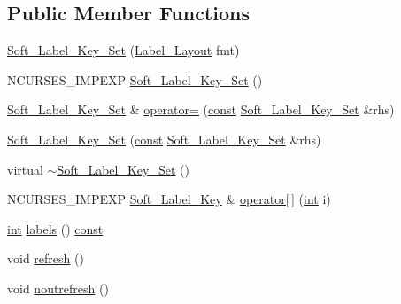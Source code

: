 \subsection*{Public Member Functions}
\begin{DoxyCompactItemize}
\item 
\hyperlink{class_soft___label___key___set_a720d08d51f3d9097fd07fd54a43b7961}{Soft\-\_\-\-Label\-\_\-\-Key\-\_\-\-Set} (\hyperlink{class_soft___label___key___set_a4d68b5593db1c9c763e3916b2b6edaf6}{Label\-\_\-\-Layout} fmt)
\item 
N\-C\-U\-R\-S\-E\-S\-\_\-\-I\-M\-P\-E\-X\-P \hyperlink{class_soft___label___key___set_aa7d2edb80b72f3f586da60cecfabc5c3}{Soft\-\_\-\-Label\-\_\-\-Key\-\_\-\-Set} ()
\item 
\hyperlink{class_soft___label___key___set}{Soft\-\_\-\-Label\-\_\-\-Key\-\_\-\-Set} \& \hyperlink{class_soft___label___key___set_a91a613cd892ad855463bf6207fef5a23}{operator=} (\hyperlink{term__entry_8h_a57bd63ce7f9a353488880e3de6692d5a}{const} \hyperlink{class_soft___label___key___set}{Soft\-\_\-\-Label\-\_\-\-Key\-\_\-\-Set} \&rhs)
\item 
\hyperlink{class_soft___label___key___set_a3cdd14d0729a75cd9eecfa1b257b1582}{Soft\-\_\-\-Label\-\_\-\-Key\-\_\-\-Set} (\hyperlink{term__entry_8h_a57bd63ce7f9a353488880e3de6692d5a}{const} \hyperlink{class_soft___label___key___set}{Soft\-\_\-\-Label\-\_\-\-Key\-\_\-\-Set} \&rhs)
\item 
virtual \hyperlink{class_soft___label___key___set_a95c991cdc09ab0dd46cef831c0d4547c}{$\sim$\-Soft\-\_\-\-Label\-\_\-\-Key\-\_\-\-Set} ()
\item 
N\-C\-U\-R\-S\-E\-S\-\_\-\-I\-M\-P\-E\-X\-P \hyperlink{class_soft___label___key___set_1_1_soft___label___key}{Soft\-\_\-\-Label\-\_\-\-Key} \& \hyperlink{class_soft___label___key___set_a4b77097c2731346fab8333271dff218d}{operator\mbox{[}$\,$\mbox{]}} (\hyperlink{term__entry_8h_ad65b480f8c8270356b45a9890f6499ae}{int} i)
\item 
\hyperlink{term__entry_8h_ad65b480f8c8270356b45a9890f6499ae}{int} \hyperlink{class_soft___label___key___set_a94630933a6762d60f4e99361f5336727}{labels} () \hyperlink{term__entry_8h_a57bd63ce7f9a353488880e3de6692d5a}{const} 
\item 
void \hyperlink{class_soft___label___key___set_a0e595765ee3af30a79357e44bc4f57cb}{refresh} ()
\item 
void \hyperlink{class_soft___label___key___set_ad490f09fd99444ed449a355abb6926be}{noutrefresh} ()
\item 

\end{DoxyCompactItemize}
